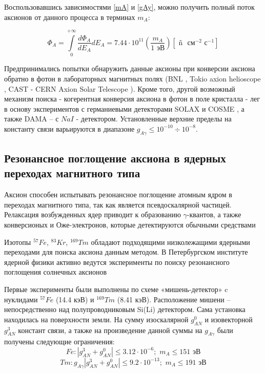 \documentclass[a4paper,article,14pt]{extarticle}
\begin{document}
Воспользовавшись зависимостями \eqref{mA} и \eqref{gAy}, можно получить полный поток аксионов от данного процесса в терминах $m_A$:

\begin{equation}
 {\Phi _A} = \int\limits_0^{ + \infty } {\frac{{d{\Phi _A}}}{{d{E_A}}}d{E_A} } = 7.44 \cdot {10^{11}}\left( {\frac{{{m_A}}}{{1{\text{ эВ}}}}} \right)\left[ {{\text{ \~n }}{{\text{ см}}^{ - 2}}{{\text{ с}}^{ - 1}}} \right]
\end{equation}

Предпринимались попытки обнаружить данные аксионы при конверсии аксиона обратно в фотон в лабораторных магнитных полях (BNL \cite{lazarus1992search}, Tokio axion helioscope \cite{moriyama1998direct,inoue2002search}, CAST - CERN Axion Solar Telescope \cite{beltran2005search}). Кроме того, другой возможный механизм поиска - когерентная конверсия аксиона в фотон в поле кристалла \cite{paschos1994proposal} - лег в основу экспериментов с германиевыми детекторами SOLAX \cite{avignone1998first, avignone1999solar} и COSME \cite{scopel1998theoretical, morales2002particle}, а также DAMA \cite{bernabei2001search} -- с $NaI$ - детектором. Установленные верхние пределы на константу связи варьируются в диапазоне $g_{A \gamma} \leqslant {10^{ - 10}} \div {10^{ - 8}}$.

\subsection{Резонансное поглощение аксиона в ядерных переходах магнитного типа}

Аксион способен испытывать резонансное поглощение атомным ядром в переходах магнитного типа, так как является псевдоскалярной частицей. Релаксация возбужденных ядер приводит к образованию $\gamma$-квантов, а также конверсионых и Оже-электронов, которые детектируются обычными средствами

Изотопы $^{57}Fe$, $^{83}Kr$, $^{169}Tm$ обладают подходящими низколежащими ядерными переходами для поиска аксиона данным методом. В Петербургском институте ядерной физики активно ведутся эксперименты по поиску резонансного поглощения солнечных аксионов \cite{Derbin2005,Derbin2007,Derbin2009, muratova2015searches, newlimits_tm}

Первые эксперименты были выполнены по схеме «мишень-детектор» c нуклидами $^{57}Fe$ (14.4 кэВ) и $^{169}Tm$ (8.41 кэВ). Расположение мишени -- непосредственно над полупроводниковым Si(Li) детектором. Сама установка находилась на поверхности земли. На сумму изоскалярной $g_{AN}^0$ и изовекторной $g_{AN}^3$ констант связи, а также на произведение данной суммы на $g_{A\gamma}$ были получены следующие ограничения:
\begin{equation}
    Fe:\left| {g_{AN}^3 + g_{AN}^0} \right| \leqslant 3.12 \cdot {10^{ - 6}};\,\,{m_A} \leqslant 151 \text{ эВ}
\end{equation}
\begin{equation}
    Tm:{g_{A\gamma }}\left| {g_{AN}^3 + g_{AN}^0} \right| \leqslant 9.2 \cdot {10^{ - 13}};\,\,{m_A} \leqslant 191 \text{ эВ}
\end{equation}
\end{document}
